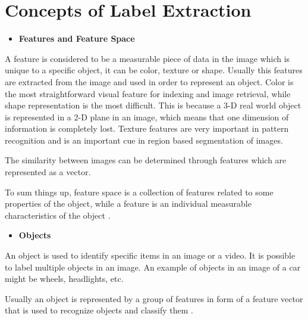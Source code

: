 \newpage

    
\section{Concepts of Label Extraction}
\label{sec:fundamental}




\begin{itemize}
    \item \textbf{Features and Feature Space}
\end{itemize}

    \label{sec:featurespace}
    \par A feature is considered to be a measurable piece of data in the image which is unique to a specific object, it can be color, texture or shape. Usually this features are extracted from the image and used in order to represent an object. Color is the most straightforward visual feature for indexing and image retrieval, while shape representation is the most difficult. This is because a 3-D real world object is represented in a 2-D plane in an image, which means that one dimension of information is completely lost. Texture features are very important in pattern recognition and is an important cue in region based segmentation of images.

    \par The similarity between images can be determined through features which are represented as a vector. 

    \par To sum things up, feature space is a collection of features related to some properties of the object, while a feature is an individual measurable characteristics of the object \cite{Tiwari2013}.

    \begin{itemize}
        \item \textbf{Objects}
    \end{itemize}

 
    \par An object is used to identify specific items in an image or a video. It is possible to label multiple objects in an image. An example of objects in an image of a car might be wheels, headlights, etc.
    \par Usually an object is represented by a group of features in form of a feature vector that is used to recognize objects and classify them \cite{Tiwari2013}.

